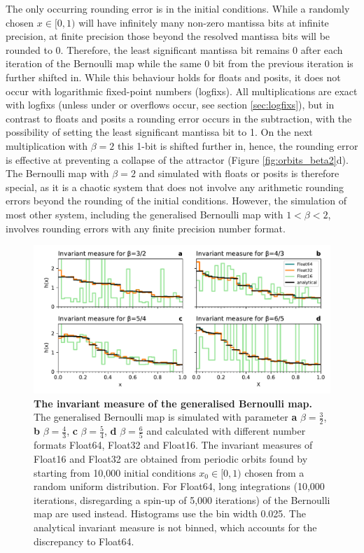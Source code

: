 The only occurring rounding error is in the initial conditions. While a randomly chosen $x \in [0,1)$ will have infinitely many non-zero
mantissa bits at infinite precision, at finite precision those beyond the resolved mantissa bits will be rounded to 0. Therefore, the least
significant mantissa bit remains 0 after each iteration of the Bernoulli map while the same 0 bit from the previous iteration is further
shifted in. While this behaviour holds for floats and posits, it does not occur with logarithmic fixed-point numbers (logfixs). All multiplications
are exact with logfixs (unless under or overflows occur, see section \ref{sec:logfixs}), but in contrast to floats and posits a rounding error
occurs in the subtraction, with the possibility of setting the least significant mantissa bit to 1. On the next multiplication with
$\beta=2$ this 1-bit is shifted further in, hence, the rounding error is effective at preventing a collapse of the attractor
(Figure \ref{fig:orbits_beta2}d). The Bernoulli map with $\beta=2$ and simulated with floats or posits is therefore special, as it is a
chaotic system that does not involve any arithmetic rounding errors beyond the rounding of the initial conditions. However, the
simulation of most other system, including the generalised Bernoulli map with $1<\beta<2$, involves rounding errors with any 
finite precision number format.

\begin{figure}[tbhp]
	\includegraphics[width=1\textwidth]{Figures/orbits/inv_measures.pdf}
	\caption{\textbf{The invariant measure of the generalised Bernoulli map.}
	The generalised Bernoulli map is simulated with parameter \textbf{a} $\beta = \tfrac{3}{2}$,
	\textbf{b} $\beta = \tfrac{4}{3}$, \textbf{c} $\beta = \tfrac{5}{4}$, \textbf{d} $\beta = \tfrac{6}{5}$ and
	calculated with different number formats Float64, Float32 and Float16. The invariant measures of
	Float16 and Float32 are obtained from periodic orbits found by starting from 10,000 initial conditions
	$x_0 \in [0,1)$ chosen from a random uniform distribution. For Float64, long integrations (10,000 iterations,
	disregarding a spin-up of 5,000 iterations) of the Bernoulli map are used instead.
	Histograms use the bin width 0.025. The analytical invariant measure is not binned,
	which accounts for the discrepancy to Float64.}
	\label{fig:orbits_inv_measures}
\end{figure}

